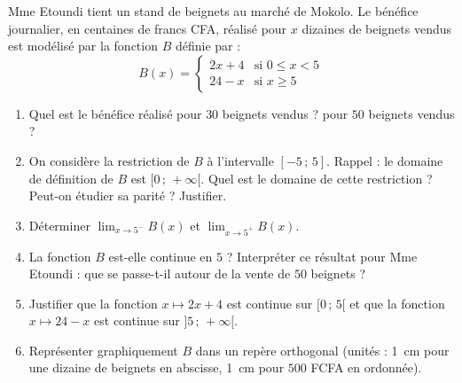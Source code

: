 \documentclass[11pt]{article}
\begin{document}
\begin{exercice}
Mme Etoundi tient un stand de beignets au marché de Mokolo. Le bénéfice journalier, en centaines de francs CFA, réalisé pour $x$ dizaines de beignets vendus est modélisé par la fonction $B$ définie par :
\[ B(x)=\begin{cases} 2x+4 & \text{si } 0\leq x<5 \\ 24-x & \text{si } x\geq 5 \end{cases} \]
\begin{enumerate}
\item Quel est le bénéfice réalisé pour $30$ beignets vendus ? pour $50$ beignets vendus ?
\item On considère la restriction de $B$ à l'intervalle $[-5\,;\,5]$. Rappel : le domaine de définition de $B$ est $[0\,;\,+\infty[$. Quel est le domaine de cette restriction ? Peut-on étudier sa parité ? Justifier.
\item Déterminer $\displaystyle\lim_{x\to 5^-}B(x)$ et $\displaystyle\lim_{x\to 5^+}B(x)$.
\item La fonction $B$ est-elle continue en $5$ ? Interpréter ce résultat pour Mme Etoundi : que se passe-t-il autour de la vente de $50$ beignets ?
\item Justifier que la fonction $x\mapsto 2x+4$ est continue sur $[0\,;\,5[$ et que la fonction $x\mapsto 24-x$ est continue sur $]5\,;\,+\infty[$.
\item Représenter graphiquement $B$ dans un repère orthogonal (unités : \SI{1}{cm} pour une dizaine de beignets en abscisse, \SI{1}{cm} pour $500$ FCFA en ordonnée).
\end{enumerate}
\end{exercice}
\end{document}
